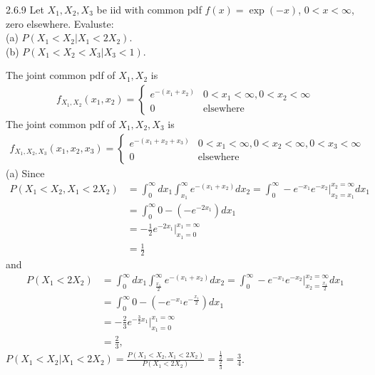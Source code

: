 \begin{exercise}{2.6.9}{}
    Let $X_1,X_2,X_3$ be iid with common pdf $f(x)=\exp(-x)$, $0<x<\infty$,
    zero elsewhere. Evaluste:\\
    (a) $P(X_1<X_2|X_1<2X_2)$.\\
    (b) $P(X_1<X_2<X_3|X_3<1)$.
\end{exercise}
\begin{solve}
    The joint common pdf of $X_1,X_2$ is
    \begin{align*}
        f_{X_1,X_2}(x_1,x_2)= \left\{\begin{matrix}
            e^{-(x_1+x_2)} & 0<x_1<\infty,0<x_2<\infty\\
            0 & \text{elsewhere}
            \end{matrix}\right.
    \end{align*}
    The joint common pdf of $X_1,X_2,X_3$ is 
    \begin{align*}
        f_{X_1,X_2,X_3}(x_1,x_2,x_3)= \left\{\begin{matrix}
            e^{-(x_1+x_2+x_3)} & 0<x_1<\infty,0<x_2<\infty,0<x_3<\infty \\
            0 & \text{elsewhere}
            \end{matrix}\right.
    \end{align*}
    (a) Since
    \begin{align*}
        P(X_1<X_2,X_1<2X_2)&=\int_{0}^{\infty}dx_1\int_{x_1}^{\infty}e^{-(x_1+x_2)} dx_2 = \int_{0}^{\infty}-e^{-x_1}e^{-x_2}|_{x_2=x_1}^{x_2=\infty}dx_1\\
                           &= \int_{0}^{\infty}0-(-e^{-2x_1})dx_1\\
                           &= -\frac{1}{2}e^{-2x_1}|_{x_1=0}^{x_1=\infty}\\
                           &= \frac{1}{2}
    \end{align*}
    and 
    \begin{align*}
        P(X_1<2X_2)&=\int_{0}^{\infty}dx_1\int_{\frac{x_1}{2}}^{\infty}e^{-(x_1+x_2)} dx_2 = \int_{0}^{\infty}-e^{-x_1}e^{-x_2}|_{x_2=\frac{x_1}{2}}^{x_2=\infty}dx_1\\
                           &= \int_{0}^{\infty}0-(-e^{-x_1}e^{-\frac{x_1}{2}})dx_1\\
                           &= -\frac{2}{3}e^{-\frac{3}{2}x_1}|_{x_1=0}^{x_1=\infty}\\
                           &= \frac{2}{3},
    \end{align*}
    $P(X_1<X_2|X_1<2X_2)=\frac{P(X_1<X_2,X_1<2X_2)}{P(X_1<2X_2)}=\frac{\frac{1}{2}}{\frac{2}{3}}=\frac{3}{4}$.

\end{solve}
